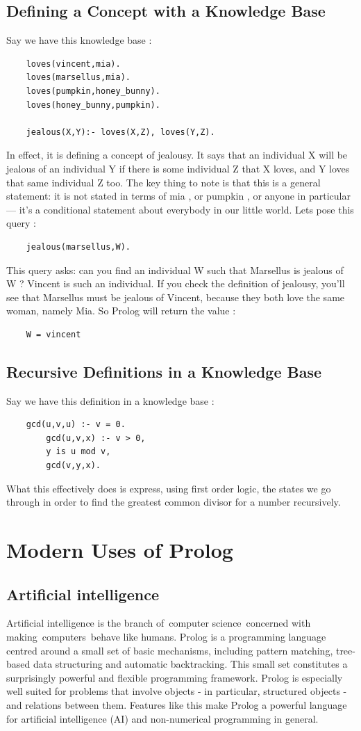 \documentclass[14pt]{article}
\begin{document}
\subsection{Defining a Concept with a Knowledge Base}
Say we have this knowledge base :
\begin{verbatim}
	loves(vincent,mia).
	loves(marsellus,mia).
	loves(pumpkin,honey_bunny).
	loves(honey_bunny,pumpkin).

	jealous(X,Y):- loves(X,Z), loves(Y,Z).
\end{verbatim}
In effect, it is defining a concept of jealousy. It says that an 
individual X will be jealous of an individual Y if there is some 
individual Z that X loves, and Y loves that same individual Z too. The 
key thing to note is that this is a general statement: it is not stated 
in terms of mia , or pumpkin , or anyone in particular — it’s a 
conditional statement about everybody in our little world. Lets pose 
this query :
\begin{verbatim}
	jealous(marsellus,W).
\end{verbatim}
This query asks: can you find an individual W such that Marsellus is 
jealous of W ? Vincent is such an individual. If you check the definition of jealousy, you’ll see that Marsellus must be jealous of Vincent, because they both love the same woman, namely Mia. So Prolog will return the value :
\begin{verbatim}
	W = vincent
\end{verbatim}
\subsection{Recursive Definitions in a Knowledge Base}
Say we have this definition in a knowledge base :
\begin{verbatim}
	gcd(u,v,u) :- v = 0.
		gcd(u,v,x) :- v > 0,
		y is u mod v,
		gcd(v,y,x).
\end{verbatim}
What this effectively does is express, using first order logic, the 
states we go through in order to find the greatest common divisor 
for a number recursively. 
\newpage
\section{Modern Uses of Prolog}
\subsection{Artificial intelligence}

Artificial intelligence is the branch of computer science concerned with making computers behave like humans. Prolog is a programming language centred around a small set of basic mechanisms, including pattern matching, tree-based data structuring and automatic backtracking. This small set constitutes a surprisingly powerful and flexible programming framework. Prolog is especially well suited for problems that involve objects - in particular, structured objects - and relations between them. Features like this make Prolog a powerful language for artificial intelligence (AI) and non-numerical programming in general.
\end{document}
